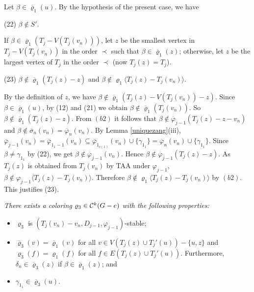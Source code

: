 \documentclass[11pt]{article}
\newcommand{\phibar}{\overline{\varphi}}
\begin{document}
Let $\beta \in \overline{\varrho}_1(u)$. By the hypothesis of the present case, we have

(22) $\beta\notin S'$.

\noindent If $\beta \in \overline{\varrho}_1(T_j-V(T_j(v_n)))$, let $z$ be the smallest vertex in $T_j-V(T_j(v_n))$ in the order $\prec$ 
such that $\beta \in \overline{\varrho}_1(z)$; otherwise, let $z$ be the largest vertex of $T_j$ in the order $\prec$ (now $T_j(z)=T_j$).

(23) $\beta\notin \overline{\varrho}_1(T_j(z)-z)$ and $\beta\notin \varrho_1\langle T_j(z)-T_j(v_n) \rangle $.

By the definition of $z$, we have $\beta\notin \overline{\varrho}_1(T_j(z)-V(T_j(v_n))-z)$. Since $\beta \in \overline{\varrho}_1(u)$, by (12) and (21) 
we obtain $\beta\notin \overline{\varrho}_1(T_j(v_n))$. So $\beta\notin \overline{\varrho}_1(T_j(z)-z)$.  From $(b2)$ it follows that 
$\beta \notin \overline{\varphi}_{j-1}(T_j(z)-z-v_n)$ and $\beta\notin \overline{\sigma}_n(v_n)=\phibar_n(v_n)$. By Lemma \ref{uniquezang}(iii),  
$\phibar_{j-1}(v_n)= \phibar_{1_1-1}(v_n) \subseteq \phibar_{1_{c(1)}}(v_n) \cup \{\gamma_{1_1}\} = \phibar_n(v_n) \cup \{\gamma_{1_1}\}$.
Since $\beta\ne \gamma_{1_1}$ by (22), we get $\beta\notin\phibar_{j-1}(v_n)$. Hence $\beta \notin \overline{\varphi}_{j-1}(T_j(z)-z)$.
As $T_j(z)$ is obtained from $T_j(v_n)$ by TAA under $\varphi_{j-1}$, $\beta\notin \varphi_{j-1} \langle T_j(z)-T_j(v_n) \rangle $. 
Therefore $\beta\notin \varrho_1 \langle T_j(z)-T_j(v_n) \rangle $ by $(b2)$. This justifies (23). 

\vskip 2mm
 {\em
There exists a coloring $\varrho_3 \in {\cal C}^k(G-e)$ with the following properties:
\begin{itemize}
\vspace{-2mm}
\item[(d1)] $\varrho_3$ is $(T_j(v_n)-v_n,D_{j-1},\varphi_{j-1})$-stable;
\vspace{-2mm}
\item[(d2)] $\overline{\varrho}_3(v)=\overline{\varrho}_1(v)$ for all $v\in V(T_j(z)\cup T_j'(u))-\{u,z\}$ and $\varrho_3(f)={\varrho}_1(f)$ 
for all $f\in E(T_j(z)\cup T_j'(u))$. Furthermore, $\delta_n\in \overline{\varrho}_3(z)$ if $\beta \in \overline{\varrho}_1(z)$; and
\vspace{-2mm}		
\item[(d3)] $\gamma_{1_1}\in \overline{\varrho}_3(u)$.
\end{itemize}	}
\end{document}
